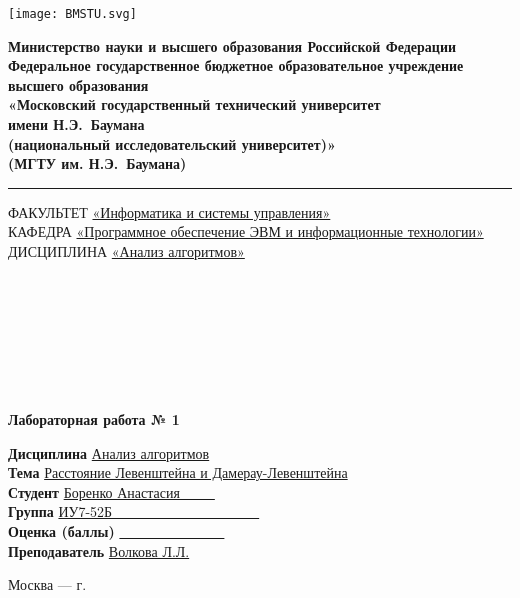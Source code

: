 
\begin{titlepage}
    


    \noindent \begin{minipage}{0.20\textwidth}
        \texttt{[image: BMSTU.svg]}
    \end{minipage}
    \noindent\begin{minipage}{0.8\textwidth}\centering \singlespacing\small
        \textbf{Министерство науки и высшего образования Российской Федерации}\\
        \textbf{Федеральное государственное бюджетное образовательное учреждение высшего образования}\\
        \textbf{«Московский государственный технический университет \\ имени Н.Э.~Баумана}\\
        \textbf{(национальный исследовательский университет)»}\\
        \textbf{(МГТУ им. Н.Э.~Баумана)}
    \end{minipage}
    
    \noindent\rule{18cm}{3pt}


    \begin{flushleft}
    \small{ФАКУЛЬТЕТ \underline{«Информатика и системы управления»}\\    
    КАФЕДРА \underline{«Программное обеспечение ЭВМ и информационные технологии»}}\\
    ДИСЦИПЛИНА \underline{«Анализ алгоритмов»}
    \end{flushleft}

    \
    
    \ 
    
    \ 
    
    \ 
    
    \begin{center}
        \Large\textbf{Лабораторная работа № 1}
    \end{center}


    \begin{flushleft}
        \textbf{Дисциплина} \underline{Анализ алгоритмов}\\
        \textbf{Тема} \underline{Расстояние Левенштейна и Дамерау-Левенштейна}\\
        \textbf{Студент} \underline{Боренко Анастасия~~~~~}\\
        \textbf{Группа} \underline{ИУ7-52Б~~~~~~~~~~~~~~~~~~~~~}\\
        \textbf{Оценка (баллы)} \underline{~~~~~~~~~~~~~~~}\\
        \textbf{Преподаватель} \underline{Волкова Л.Л.}
    \end{flushleft}
    
        
    \begin{center}
        \vfill
        Москва --- \the\year г.
    \end{center}

\end{titlepage}


\tableofcontents 